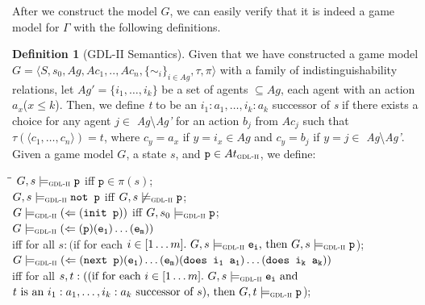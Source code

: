 \documentclass{article}
\theoremstyle{theorem}
\theoremstyle{lemma}
\theoremstyle{definition}
\newtheorem{definition}{Definition}[section]
\theoremstyle{remark}
\begin{document}
\par After we construct the model $G$, we can easily verify that it is indeed a game model for $\Gamma$ with the following definitions.
\begin{definition}[GDL-II Semantics]
    Given that we have constructed a game model $G=\langle{S, s_{0}, Ag, Ac_{1}, .., Ac_{n}, \{ \sim_i \}_{i \in Ag}, \tau, \pi}\rangle$ with a family of indistinguishability relations, let $Ag' = \{i_1,\ldots,i_k \}$ be a set of agents $\subseteq Ag$, each agent with an action $a_x$($x \leq k$). Then, we define \textit{t} to be an $i_1: a_1,\ldots,i_k:a_k$ successor of \textit{s} if there exists a choice for any agent $j\in$ \textit{Ag}\textbackslash \textit{Ag'} for an action $b_j$ from $Ac_j$ such that $\tau(\langle{c_1,\ldots,c_n}\rangle)=t$, where $c_y=a_x$ if $y=i_x \in Ag$ and $c_y=b_j$ if $y=j \in$ \textit{Ag}\textbackslash \textit{Ag'}. Given a game model $G$, a state $s$, and $\texttt{p} \in At_\textsc{gdl-ii}$, we define:
    \begin{tabbing}
    \hspace{0.5cm} \= \hspace*{8cm}\= \kill
    \> $G,s \models_\textsc{gdl-ii} \texttt{p}$ \> iff $\texttt{p} \in \pi(s)$;\\
    \> $G,s \models_\textsc{gdl-ii} \texttt{not p}$ \> iff $G,s \not \models_\textsc{gdl-ii} \texttt{p}$;\\
    \> $G \models_\textsc{gdl-ii} (\Leftarrow (\texttt{init p}))$ \> iff $G,s_0 \models_\textsc{gdl-ii} \texttt{p}$;\\    
    \> $G \models_\textsc{gdl-ii} (\Leftarrow(\texttt{p}) (\texttt{e\textsubscript{1}}) \ldots(\texttt{e\textsubscript{m}}))$\\
    \>\hspace{1cm} iff for all $s:($if for each $i \in [1\ldots m].\ G, s \models_\textsc{gdl-ii} \texttt{e\textsubscript{i}}\text{, then } G,s \models_\textsc{gdl-ii} \texttt{p}$);\\
    \> $G \models_\textsc{gdl-ii} (\Leftarrow(\texttt{next p}) (\texttt{e\textsubscript{1}}) \ldots(\texttt{e\textsubscript{m}}) (\texttt{does i\textsubscript{1} a\textsubscript{1}}) \ldots(\texttt{does i\textsubscript{k} a\textsubscript{k}}))$ \\
    \>\hspace{1cm} iff for all $s,t:((\text{if for each } i \in [1\ldots m].\ G, s \models_\textsc{gdl-ii} \texttt{e\textsubscript{i}}\text{ and }$ \\
    \>\hspace{3.4cm} $t \text{ is an } i_1:a_1,\ldots,i_k:a_k \text{ successor of }s)\text{, then } G,t \models_\textsc{gdl-ii} \texttt{p}$);\\

\end{tabbing}
\end{definition}
\end{document}
